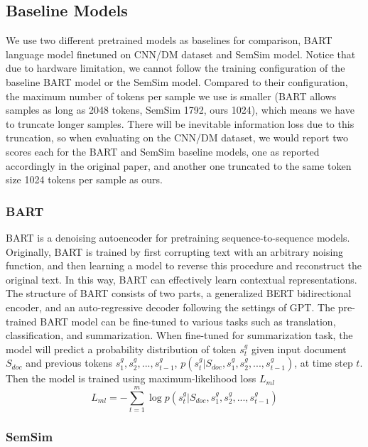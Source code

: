 \documentclass[11pt,a4paper]{article}
\begin{document}
\subsection{Baseline Models}

We use two different pretrained models as baselines for comparison, BART language model finetuned on CNN/DM dataset and SemSim model. Notice that due to hardware limitation, we cannot follow the training configuration of the baseline BART model or the SemSim model. Compared to their configuration, the maximum number of tokens per sample we use is smaller (BART allows samples as long as 2048 tokens, SemSim 1792, ours 1024), which means we have to truncate longer samples. There will be inevitable information loss due to this truncation, so when evaluating on the CNN/DM dataset, we would report two scores each for the BART and SemSim baseline models, one as reported accordingly in the original paper, and another one truncated to the same token size 1024 tokens per sample as ours.

\subsubsection{BART}

BART is a denoising autoencoder for pretraining sequence-to-sequence models. Originally, BART is trained by first corrupting text with an
arbitrary noising function, and then learning a model to reverse this procedure and reconstruct the original text. In this way, BART
can effectively learn contextual representations. The structure of BART consists of two parts, a generalized BERT\cite{devlin2018bert} bidirectional encoder, and an auto-regressive decoder following the settings of GPT\cite{radford2018improving}. The pre-trained BART model can be fine-tuned to various tasks such as translation, classification, and summarization. When fine-tuned for summarization task, the model will predict a probability distribution of token $s_t^g$ given input document $S_{doc}$ and previous tokens ${s_1^g, s_2^g, ..., s_{t-1}^g}$, $p(s_t^g|S_{doc}, s_1^g, s_2^g, ..., s_{t-1}^g)$, at time step $t$. Then the model is trained using maximum-likelihood loss $L_{ml}$
\begin{equation}
    L_{ml} = -\sum_{t=1}^m \log p(s_t^g|S_{doc}, s_1^g, s_2^g, ..., s_{t-1}^g)
\end{equation}

\subsubsection{SemSim}
\end{document}
